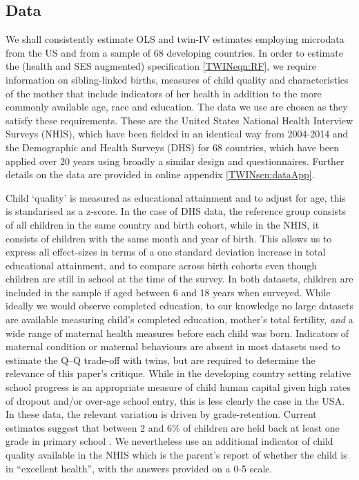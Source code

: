 \documentclass[subeqn]{article}
\begin{document}
\begin{spacing}{1.4}
\subsection{Data}                                  \label{TWINsscn:data}
We shall consistently estimate OLS and twin-IV estimates employing microdata from the US and from a sample of 68 developing countries. In order to estimate
the (health and SES augmented) specification \ref{TWINeqn:RF}, we require information on sibling-linked births, measures of child quality and characteristics of the mother that include indicators of her health in addition to the more commonly available age, race and education. The data we use are chosen as they satisfy these requirements. These are the United States National Health Interview Surveys (NHIS), which have been fielded in an identical way from 2004-2014 and the Demographic and Health Surveys (DHS) for 68 countries, which have been applied over 20 years using broadly a similar design and questionnaires. Further details on the data are provided in online appendix \ref{TWINscn:dataApp}.

Child `quality' is measured as educational attainment and to adjust for age, this is standarised as a z-score. In the case of DHS data, the reference group
consists of all children in the same country and birth cohort, while in the NHIS, it consists of children with the same month and year of birth. This 
allows us to express all effect-sizes in terms of a one standard deviation increase in total educational attainment, and to compare across birth cohorts
even though children are still in school at the time of the survey.
In both datasets, children are included in the sample if aged between 6 and 18 years when surveyed.  While
ideally we would observe completed education, to our knowledge no large datasets
are available measuring child's completed education, mother's total fertility,
\emph{and} a wide range of maternal health measures before each child was born.
Indicators of maternal condition or maternal behaviours are absent in most datasets used to estimate the
Q--Q trade-off with twins, but are required to determine the relevance of this
paper's critique. While in the developing country setting relative school
progress is an appropriate measure of child human capital given high rates of
dropout and/or over-age school entry, this is less clearly the case in the USA. In these data, the relevant variation is driven by grade-retention.
Current estimates suggest that between 2 and 6\% of children are held back at
least one grade in primary school \citep{Warrenetal2014}. We nevertheless use an additional indicator of child quality available in the NHIS which is the parent's report of
whether the child is in ``excellent health'', with the answers provided on a 0-5 scale.


\end{spacing}
\end{document}
